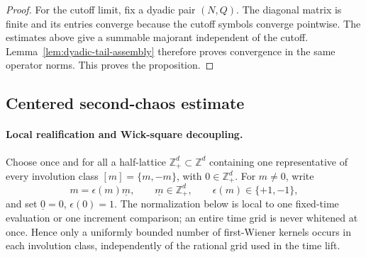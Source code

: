 \documentclass[11pt,reqno]{amsart}
\numberwithin{equation}{section}
\theoremstyle{plain}
\theoremstyle{definition}
\newcommand{\Z}{\mathbb Z}
\begin{document}
\begin{proof}
For the cutoff limit, fix a dyadic pair \((N,Q)\).  The diagonal matrix is finite and its entries converge because the cutoff symbols converge pointwise.  The estimates above give a summable majorant independent of the cutoff.  Lemma~\ref{lem:dyadic-tail-assembly} therefore proves convergence in the same operator norms.  This proves the proposition.
\end{proof}


\subsection{Centered second-chaos estimate}\label{sec:centered}


\paragraph{Local realification and Wick-square decoupling.}\label{subsec:local-whitening}
Choose once and for all a half-lattice \(\Z^d_+\subset\Z^d\) containing one
representative of every involution class \([m]=\{m,-m\}\), with \(0\in
\Z^d_+\).  For \(m\ne0\), write
\[
        m=\epsilon(m)\underline m,
        \qquad \underline m\in\Z^d_+,
        \qquad \epsilon(m)\in\{+1,-1\},
\]
and set \(\underline{0}=0\), \(\epsilon(0)=1\).  The normalization below is
local to one fixed-time evaluation or one increment comparison; an entire
time grid is never whitened at once.  Hence only a uniformly bounded number
of first-Wiener kernels occurs in each involution class, independently of
the rational grid used in the time lift.
\end{document}
